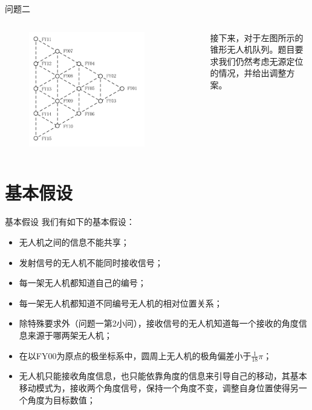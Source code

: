 \documentclass[aspectratio=169]{beamer}
\begin{document}
\begin{frame}{问题二}
    \begin{columns}
        \begin{figure}[!ht]
            \centering
            \includegraphics[width=0.8\textwidth]{图片/锥形队列.pdf}
        \end{figure}
        接下来，对于左图所示的锥形无人机队列。题目要求我们仍然考虑无源定位的情况，并给出调整方案。
    \end{columns}
\end{frame}


\section{基本假设}

\begin{frame}{基本假设}
    我们有如下的基本假设：
    \begin{itemize}
        \item 无人机之间的信息不能共享；
        \item 发射信号的无人机不能同时接收信号；
        \item 每一架无人机都知道自己的编号；
        \item 每一架无人机都知道不同编号无人机的相对位置关系；
        \item 除特殊要求外（问题一第2小问），接收信号的无人机知道每一个接收的角度信息来源于哪两架无人机；
        \item 在以FY00为原点的极坐标系中，圆周上无人机的极角偏差小于$\frac{1}{18}\pi$；
        \item 无人机只能接收角度信息，也只能依靠角度的信息来引导自己的移动，其基本移动模式为，接收两个角度信号，保持一个角度不变，调整自身位置使得另一个角度为目标数值；
    \end{itemize}
\end{frame}
\end{document}
